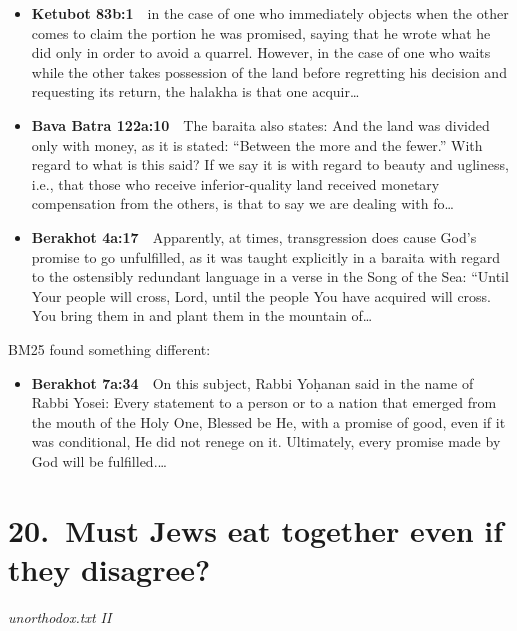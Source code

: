 \documentclass[11pt,a4paper]{article}
\begin{document}
\begin{itemize}[leftmargin=1.2em,itemsep=3pt]
\item {\color{ref}\textbf{Ketubot 83b:1}}\ \ in the case of one who immediately objects when the other comes to claim the portion he was promised, saying that he wrote what he did only in order to avoid a quarrel. However, in the case of one who waits while the other takes possession of the land before regretting his decision and requesting its return, the halakha is that one acquir\ldots
\item {\color{ref}\textbf{Bava Batra 122a:10}}\ \ The baraita also states: And the land was divided only with money, as it is stated: “Between the more and the fewer.” With regard to what is this said? If we say it is with regard to beauty and ugliness, i.e., that those who receive inferior-quality land received monetary compensation from the others, is that to say we are dealing with fo\ldots
\item {\color{ref}\textbf{Berakhot 4a:17}}\ \ Apparently, at times, transgression does cause God’s promise to go unfulfilled, as it was taught explicitly in a baraita with regard to the ostensibly redundant language in a verse in the Song of the Sea: “Until Your people will cross, Lord, until the people You have acquired will cross. You bring them in and plant them in the mountain of\ldots
\end{itemize}
{\color{quiet}\small BM25 found something different:}
\begin{itemize}[leftmargin=1.2em]
\item {\color{ref}\textbf{Berakhot 7a:34}}\ \ On this subject, Rabbi Yoḥanan said in the name of Rabbi Yosei: Every statement to a person or to a nation that emerged from the mouth of the Holy One, Blessed be He, with a promise of good, even if it was conditional, He did not renege on it. Ultimately, every promise made by God will be fulfilled.\ldots
\end{itemize}

\section*{20.\ Must Jews eat together even if they disagree?}
{\color{quiet}\small\textit{unorthodox.txt II}}
\end{document}
